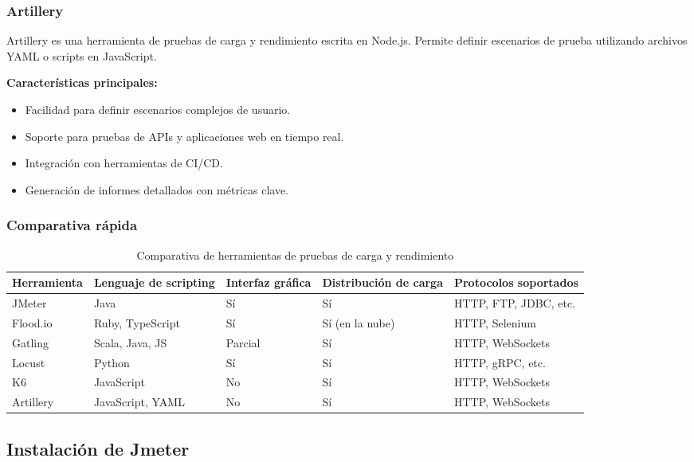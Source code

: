 \subsubsection{Artillery}

Artillery es una herramienta de pruebas de carga y rendimiento escrita en Node.js. Permite definir escenarios de prueba utilizando archivos YAML o scripts en JavaScript.

\textbf{Características principales:}
\begin{itemize}
    \item Facilidad para definir escenarios complejos de usuario.
    \item Soporte para pruebas de APIs y aplicaciones web en tiempo real.
    \item Integración con herramientas de CI/CD.
    \item Generación de informes detallados con métricas clave.
\end{itemize}

\subsubsection{Comparativa rápida}

\begin{table}[H]
\centering
\begin{tabular}{|p{3cm}|p{3cm}|p{3cm}|p{3cm}|p{3cm}|}
\hline
\textbf{Herramienta} & \textbf{Lenguaje de scripting} & \textbf{Interfaz gráfica} & \textbf{Distribución de carga} & \textbf{Protocolos soportados} \\ \hline
JMeter & Java & Sí & Sí & HTTP, FTP, JDBC, etc. \\ \hline
Flood.io & Ruby, TypeScript & Sí & Sí (en la nube) & HTTP, Selenium \\ \hline
Gatling & Scala, Java, JS & Parcial & Sí & HTTP, WebSockets \\ \hline
Locust & Python & Sí & Sí & HTTP, gRPC, etc. \\ \hline
K6 & JavaScript & No & Sí & HTTP, WebSockets \\ \hline
Artillery & JavaScript, YAML & No & Sí & HTTP, WebSockets \\ \hline
\end{tabular}
\caption{Comparativa de herramientas de pruebas de carga y rendimiento}
\end{table}

\subsection{Instalación de Jmeter}

